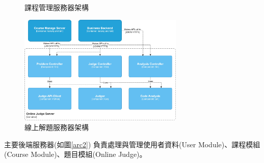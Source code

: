 \documentclass[12pt]{article}
\begin{document}
\begin{enumerate}
\begin{enumerate}
\begin{figure}[htbp]
          \caption{課程管理服務器架構}
          \label{arc3}
        \end{figure}
        \begin{figure}[htbp]
          \centering
          \includegraphics[width=0.7\textwidth]{./img/arc4.jpg}
          \caption{線上解題服務器架構}
          \label{arc4}
        \end{figure}
    
        \par 主要後端服務器(如圖\ref{arc2})
          負責處理與管理使用者資料(User Module)、課程模組(Course Module)、題目模組(Online Judge)。
        

\end{enumerate}
\end{enumerate}
\end{document}
